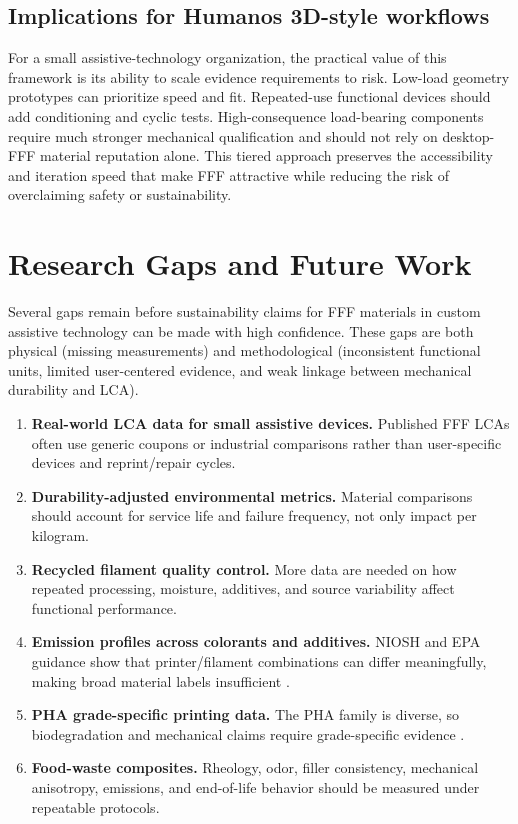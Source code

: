 \documentclass[11pt]{article}
\begin{document}
\subsection{Implications for Humanos 3D-style workflows}

For a small assistive-technology organization, the practical value of this framework is its ability to scale evidence requirements to risk. Low-load geometry prototypes can prioritize speed and fit. Repeated-use functional devices should add conditioning and cyclic tests. High-consequence load-bearing components require much stronger mechanical qualification and should not rely on desktop-FFF material reputation alone. This tiered approach preserves the accessibility and iteration speed that make FFF attractive while reducing the risk of overclaiming safety or sustainability.

\section{Research Gaps and Future Work}

Several gaps remain before sustainability claims for FFF materials in custom assistive technology can be made with high confidence. These gaps are both physical (missing measurements) and methodological (inconsistent functional units, limited user-centered evidence, and weak linkage between mechanical durability and LCA).

\begin{enumerate}
  \item \textbf{Real-world LCA data for small assistive devices.} Published FFF LCAs often use generic coupons or industrial comparisons rather than user-specific devices and reprint/repair cycles.
  \item \textbf{Durability-adjusted environmental metrics.} Material comparisons should account for service life and failure frequency, not only impact per kilogram.
  \item \textbf{Recycled filament quality control.} More data are needed on how repeated processing, moisture, additives, and source variability affect functional performance.
  \item \textbf{Emission profiles across colorants and additives.} NIOSH and EPA guidance show that printer/filament combinations can differ meaningfully, making broad material labels insufficient \cite{niosh2023,epa3dprinting}.
  \item \textbf{PHA grade-specific printing data.} The PHA family is diverse, so biodegradation and mechanical claims require grade-specific evidence \cite{zhou2023,getino2024}.
  \item \textbf{Food-waste composites.} Rheology, odor, filler consistency, mechanical anisotropy, emissions, and end-of-life behavior should be measured under repeatable protocols.
\end{enumerate}
\end{document}

